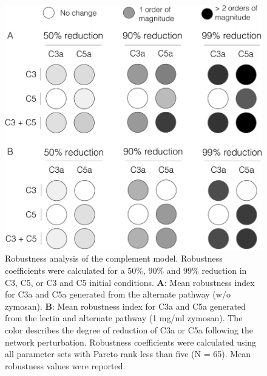 \documentclass[12pt]{article}
\begin{document}
\begin{figure}[ht]
\centering
\includegraphics[width=1.0\textwidth]{./figs/Figure6_RobustnessAnalysis_v4.pdf}
\caption{Robustness analysis of the complement model.
Robustness coefficients were calculated for a 50\%, 90\% and 99\% reduction in C3, C5, or C3 and C5 initial conditions.
\textbf{A}: Mean robustness index for C3a and C5a generated from the alternate pathway (w/o zymosan).
\textbf{B}: Mean robustness index for C3a and C5a generated from the lectin and alternate pathway (1 mg/ml zymosan).
The color describes the degree of reduction of C3a or C5a following the network perturbation.
Robustness coefficients were calculated using all parameter sets with Pareto rank less than five (N = 65).
Mean robustness values were reported. }\label{fig-robustness-analysis}
\end{figure}


\end{document}
